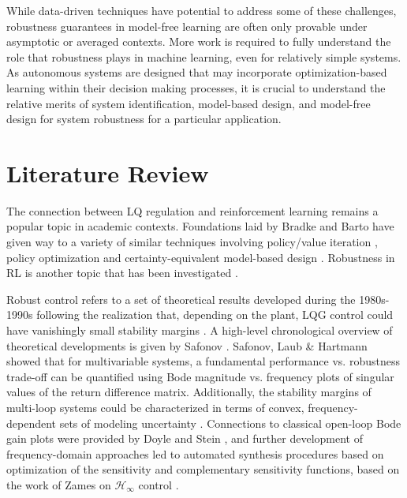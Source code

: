 While data-driven techniques have potential to address some of these challenges, robustness guarantees in model-free learning are often only provable under asymptotic or averaged contexts.  More work is required to fully understand the role that robustness plays in machine learning, even for relatively simple systems.  As autonomous systems are designed that may incorporate optimization-based learning within their decision making processes, it is crucial to understand the relative merits of system identification, model-based design, and model-free design for system robustness for a particular application.

\section{Literature Review}
\label{chap:introLiteratureReview}
The connection between LQ regulation and reinforcement learning remains a popular topic in academic contexts.  Foundations laid by Bradke and Barto \cite{bradtke1992reinforcement, bradtke1994adaptive} have given way to a variety of similar techniques involving policy/value iteration \cite{lamperski2020computing, yaghmaie2022linear, lewis2009adaptive, lewis2009reinforcement, farjadnasab2022model, wong2010reinforcement, lale2021adaptive, chen2019adaptive, cui2021combined, matni2019self, yaghmaie2019using, yang2021model, rizvi2018output, cohen2018online}, policy optimization \cite{malik2019derivative} and certainty-equivalent model-based design \cite{dean2020sample}.  Robustness in RL is another topic that has been investigated \cite{moos2022robust, venkataraman2019recovering, roberts2011feedback, pang2022robust, umenberger2019robust, dean2018regret, ho2019robust, bernat2020driver, al2007model, al2007model2, zhang2021derivative, zhang2020policy}.

Robust control refers to a set of theoretical results developed during the 1980s-1990s following the realization that, depending on the plant, LQG control could have vanishingly small stability margins \cite{doyle1978guaranteed}.  A high-level chronological overview of theoretical developments is given by Safonov \cite{safonov2012origins}.  Safonov, Laub \& Hartmann \cite{safonov1981feedback} showed that for multivariable systems, a fundamental performance vs. robustness trade-off can be quantified using Bode magnitude vs. frequency plots of singular values of the return difference matrix.  Additionally, the stability margins of multi-loop systems could be characterized in terms of convex, frequency-dependent sets of modeling uncertainty \cite{safonov1981multiloop}.  Connections to classical open-loop Bode gain plots were provided by Doyle and Stein \cite{doyle1981multivariable}, and further development of frequency-domain approaches led to automated synthesis procedures based on optimization of the sensitivity and complementary sensitivity functions, based on the work of Zames on $\mathcal{H}_{\infty}$ control \cite{zames1981feedback}.

